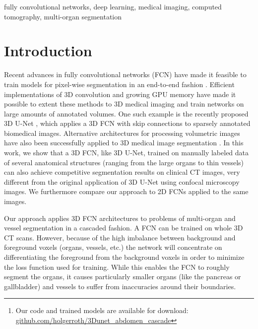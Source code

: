 \documentclass[authoryear]{elsarticle}
\begin{document}
\begin{frontmatter}
\begin{abstract}
Our experiments illustrate the promise and robustness of current 3D FCN based semantic segmentation of medical images, achieving state-of-the-art results.\footnote{Our code and trained models are available for download: \url{github.com/holgerroth/3Dunet_abdomen_cascade}}.	
\end{abstract}

\begin{keyword}
fully convolutional networks, deep learning, medical imaging, computed tomography, multi-organ segmentation
\end{keyword}

\end{frontmatter}




\clearpage
\newpage
\section{Introduction} 
Recent advances in fully convolutional networks (FCN) have made it feasible to train models for pixel-wise segmentation in an end-to-end fashion \citep{long2015fully}. Efficient implementations of 3D convolution and growing GPU memory have made it possible to extent these methods to 3D medical imaging and train networks on large amounts of annotated volumes. One such example is the recently proposed 3D U-Net \citep{cciccek20163d}, which applies a 3D FCN with skip connections to sparsely annotated biomedical images. Alternative architectures for processing volumetric images have also been successfully applied to 3D medical image segmentation \citep{milletari2016v,chen2016voxresnet,dou20173d}.
In this work, we show that a 3D FCN, like 3D U-Net, trained on manually labeled data of several anatomical structures (ranging from the large organs to thin vessels) can also achieve competitive segmentation results on clinical CT images, very different from the original application of 3D U-Net using confocal microscopy images. We furthermore compare our approach to 2D FCNs applied to the same images. 

Our approach applies 3D FCN architectures to problems of multi-organ and vessel segmentation in a cascaded fashion. A FCN can be trained on whole 3D CT scans. However, because of the high imbalance between background and foreground voxels (organs, vessels, etc.) the network will concentrate on differentiating the foreground from the background voxels in order to minimize the loss function used for training. While this enables the FCN to roughly segment the organs, it causes particularly smaller organs (like the pancreas or gallbladder) and vessels to suffer from inaccuracies around their boundaries. 
\end{document}
